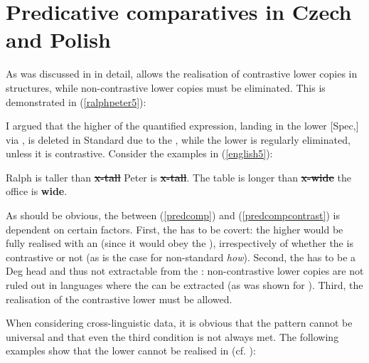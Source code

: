 \section{Predicative comparatives in Czech and Polish} \label{sec:5predicative}
As was discussed in  in detail,  allows the realisation of contrastive lower copies in  structures, while non-contrastive lower copies must be eliminated. This is demonstrated in (\ref{ralphpeter5}):

\ea \label{ralphpeter5}
 \label{predcomp}
 \label{predcompcontrast}
\z
\z

I argued that the higher  of the quantified expression, landing in the lower [Spec,] via , is deleted in Standard  due to the , while the lower  is regularly eliminated, unless it is contrastive. Consider the examples in (\ref{english5}):

\ea  \label{english5}
\ea Ralph is taller than \sout{\textbf{x-tall}} Peter is \sout{\textbf{x-tall}}.
\ex The table is longer than \sout{\textbf{x-wide}} the office is \textbf{wide}.
\z
\z

As should be obvious, the  between (\ref{predcomp}) and (\ref{predcompcontrast}) is dependent on certain factors. First, the  has to be covert: the higher  would be fully realised with an  (since it would obey the ), irrespectively of whether the  is contrastive or not (as is the case for non-standard  \textit{how}). Second, the  has to be a Deg head and thus not extractable from the : non-contrastive lower copies are not ruled out in languages where the  can be extracted (as was shown for ). Third, the realisation of the contrastive lower  must be allowed.

When considering cross-linguistic data, it is obvious that the  pattern cannot be universal and that even the third condition is not always met. The following examples show that the lower  cannot be realised in  (cf. \citealt{bacskaiatkari2015fdsl}):

\ea \label{czechpred}
\z
\z

